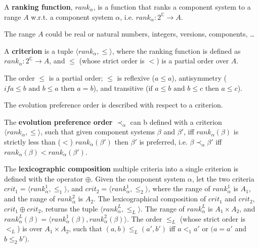 \begin{defs}
A \textbf{ranking function}, $rank_{\alpha}$, is a function that ranks a component system to a range $A$ w.r.t. a component system $\alpha$, i.e. $rank_{\alpha} : 2^{\mathbb{C}} \rightarrow A$.
\end{defs}
The range $A$ could be real or natural numbers, integers, versions, components, \ldots

\begin{defs}
\label{formal.defcriteria}
A \textbf{criterion} is a tuple $\langle rank_{\alpha}, \leq \rangle$, 
where the ranking function is defined as $rank_{\alpha} : 2^{\mathbb{C}} \rightarrow A$, and $\leq$ (whose strict order is $<$) is a partial order over $A$.
\end{defs}
The order $\leq$ is a partial order; $\leq$ is reflexive ($a \leq a$), antisymmetry ($if a \leq b \text{ and } b \leq a \text{ then } a = b$), and transitive ($ \text{if } a \leq b  \text{ and } b \leq c  \text{ then } a \leq c$).

The evolution preference order is described with respect to a criterion.
\begin{defs}
\label{formal.defcrittooptimal}
The \textbf{evolution preference order} $\prec_{\alpha}$ can b defined with a criterion $\langle rank_{\alpha}, \leq \rangle$,
such that given component systems $\beta$ and $\beta'$, iff $rank_{\alpha}(\beta)$ is strictly less than ($<$) $rank_{\alpha}(\beta')$ then $\beta'$ is preferred, 
i.e. $\beta \prec_{\alpha} \beta'$ iff $rank_{\alpha}(\beta) < rank_{\alpha}(\beta')$.
\end{defs}


\begin{defs}
\label{formal.defcritlex}
The \textbf{lexicographic composition} multiple criteria into a single criterion is defined with the operator $\oplus$.
Given the component system $\alpha$, let the two criteria $crit_1 = \langle rank^1_{\alpha}, \leq_{1} \rangle$, and $crit_2 = \langle rank^1_{\alpha}, \leq_{2} \rangle$,
where the range of $rank^1_{\alpha}$ is $A_1$, and the range of $rank^2_{\alpha}$ is $A_2$.
The lexicographical composition of $crit_1$ and $crit_2$, $crit_1 \oplus crit_2$, returns the tuple $\langle rank^L_{\alpha},\leq_L \rangle$.
The range of $rank^L_{\alpha}$ is $A_1 \times A_2$, and $rank^L_{\alpha}(\beta) = \langle rank^1_{\alpha}(\beta),rank^2_{\alpha}(\beta) \rangle$.
The order $\leq_L$ (whose strict order is $<_L$) is over $A_1 \times A_2$, such that $(a,b) \leq_L (a',b')$ iff $a <_1 a'$ or $(a = a'$ and $b \leq_2 b')$.
\end{defs}

